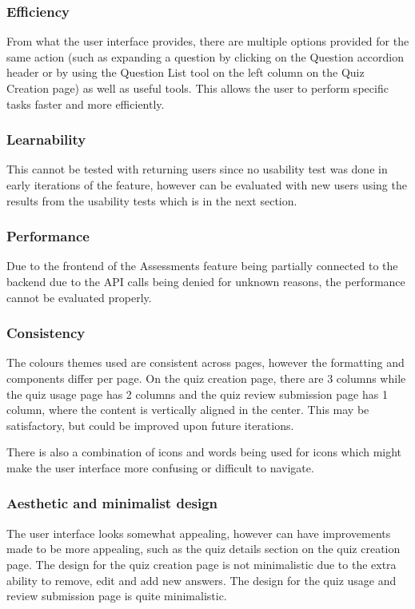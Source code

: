 \subsubsection{Efficiency}
From what the user interface provides, there are multiple options provided for the same action (such as expanding a question by clicking on the Question accordion header or by using the Question List tool on the left column on the Quiz Creation page) as well as useful tools. This allows the user to perform specific tasks faster and more efficiently. 

\subsubsection{Learnability}
This cannot be tested with returning users since no usability test was done in early iterations of the feature, however can be evaluated with new users using the results from the usability tests which is in the next section.

\subsubsection{Performance}
Due to the frontend of the Assessments feature being partially connected to the backend due to the API calls being denied for unknown reasons, the performance cannot be evaluated properly.

\subsubsection{Consistency}
The colours themes used are consistent across pages, however the formatting and components differ per page. On the quiz creation page, there are 3 columns while the quiz usage page has 2 columns and the quiz review submission page has 1 column, where the content is vertically aligned in the center. This may be satisfactory, but could be improved upon future iterations.

There is also a combination of icons and words being used for icons which might make the user interface more confusing or difficult to navigate. 

\subsubsection{Aesthetic and minimalist design}
The user interface looks somewhat appealing, however can have improvements made to be more appealing, such as the quiz details section on the quiz creation page. The design for the quiz creation page is not minimalistic due to the extra ability to remove, edit and add new answers. The design for the quiz usage and review submission page is quite minimalistic. 

